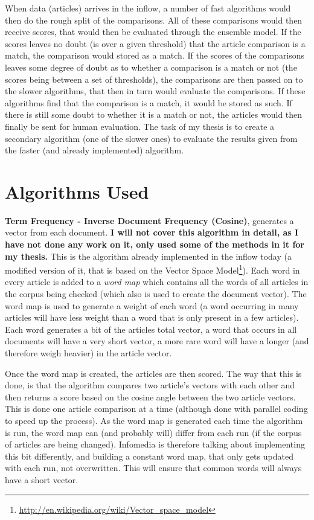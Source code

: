 When data (articles) arrives in the inflow, a number of fast algorithms would then do the rough split of the comparisons. All of these comparisons would then receive scores, that would then be evaluated through the ensemble model. If the scores leaves no doubt (is over a given threshold) that the article comparison is a match, the comparison would stored as a match. If the scores of the comparisons leaves some degree of doubt as to whether a comparison is a match or not (the scores being between a set of thresholds), the comparisons are then passed on to the slower algorithms, that then in turn would evaluate the comparisons. If these algorithms find that the comparison is a match, it would be stored as such. If there is still some doubt to whether it is a match or not, the articles would then finally be sent for human evaluation. 
The task of my thesis is to create a secondary algorithm (one of the slower ones) to evaluate the results given from the faster (and already implemented) algorithm.

\section{Algorithms Used}

\textbf{Term Frequency - Inverse Document Frequency\cite{WikiTFIDF} (Cosine)}, generates a vector from each document. \textbf{I will not cover this algorithm in detail, as I have not done any work on it, only used some of the methods in it for my thesis.} This is the algorithm already implemented in the inflow today (a modified version of it, that is based on the Vector Space Model\footnote{\url{http://en.wikipedia.org/wiki/Vector_space_model}}). Each word in every article is added to a \textit{word map} which contains all the words of all articles in the corpus being checked (which also is used to create the document vector). The word map is used to generate a weight of each word (a word occurring in many articles will have less weight than a word that is only present in a few articles). Each word generates a bit of the articles total vector, a word that occurs in all documents will have a very short vector, a more rare word will have a longer (and therefore weigh heavier) in the article vector.

Once the word map is created, the articles are then scored. The way that this is done, is that the algorithm compares two article's vectors with each other and then returns a score based on the cosine angle between the two article vectors. This is done one article comparison at a time (although done with parallel coding to speed up the process). As the word map is generated each time the algorithm is run, the word map can (and probably will) differ from each run (if the corpus of articles are being changed). Infomedia is therefore talking about implementing this bit differently, and building a constant word map, that only gets updated with each run, not overwritten. This will ensure that common words will always have a short vector.


